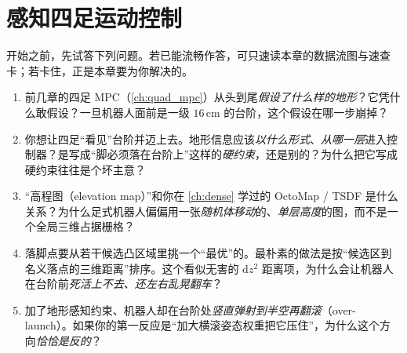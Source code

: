 \chapter{感知四足运动控制}
\label{ch:legged-perc}


\begin{practice}[前置自测]
开始之前，先试答下列问题。若已能流畅作答，可只速读本章的数据流图与速查卡；若卡住，正是本章要为你解决的。
\begin{enumerate}
  \item 前几章的四足 MPC（\cref{ch:quad_mpc}）从头到尾\emph{假设了什么样的地形}？它凭什么敢假设？一旦机器人面前是一级 $16\,$cm 的台阶，这个假设在哪一步崩掉？
  \item 你想让四足“看见”台阶并迈上去。地形信息应该\emph{以什么形式}、\emph{从哪一层}进入控制器？是写成“脚必须落在台阶上”这样的\emph{硬约束}，还是别的？为什么把它写成硬约束往往是个坏主意？
  \item “高程图（elevation map）”和你在 \cref{ch:dense} 学过的 OctoMap / TSDF 是什么关系？为什么足式机器人偏偏用一张\emph{随机体移动}的、\emph{单层高度}的图，而不是一个全局三维占据栅格？
  \item 落脚点要从若干候选凸区域里挑一个“最优”的。最朴素的做法是按“候选区到名义落点的三维距离”排序。这个看似无害的 $\mathrm{d}z^2$ 距离项，为什么会让机器人在台阶前\emph{死活上不去、还左右乱晃翻车}？
  \item 加了地形感知约束、机器人却在台阶处\emph{竖直弹射到半空再翻滚}（over-launch）。如果你的第一反应是“加大横滚姿态权重把它压住”，为什么这个方向\emph{恰恰是反的}？
\end{enumerate}
\end{practice}


